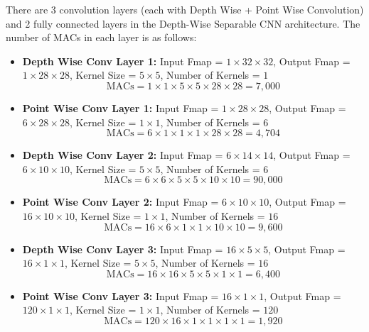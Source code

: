 \documentclass{article}
\begin{document}
There are 3 convolution layers (each with Depth Wise + Point Wise Convolution) and 2 fully connected layers in the Depth-Wise Separable CNN architecture. The number of MACs in each layer is as follows:

\begin{itemize}
    \item \textbf{Depth Wise Conv Layer 1:} Input Fmap = $1 \times 32 \times 32$, Output Fmap = $1 \times 28 \times 28$, Kernel Size = $5 \times 5$, Number of Kernels = $1$
    \begin{equation}
        \text{MACs} = 1 \times 1 \times 5 \times 5 \times 28 \times 28 = 7,000
    \end{equation}
    
    \item \textbf{Point Wise Conv Layer 1:} Input Fmap = $1 \times 28 \times 28$, Output Fmap = $6 \times 28 \times 28$, Kernel Size = $1 \times 1$, Number of Kernels = $6$
    \begin{equation}
        \text{MACs} = 6 \times 1 \times 1 \times 1 \times 28 \times 28 = 4,704
    \end{equation}
    
    \item \textbf{Depth Wise Conv Layer 2:} Input Fmap = $6 \times 14 \times 14$, Output Fmap = $6 \times 10 \times 10$, Kernel Size = $5 \times 5$, Number of Kernels = $6$
    \begin{equation}
        \text{MACs} = 6 \times 6 \times 5 \times 5 \times 10 \times 10 = 90,000
    \end{equation}
    
    \item \textbf{Point Wise Conv Layer 2:} Input Fmap = $6 \times 10 \times 10$, Output Fmap = $16 \times 10 \times 10$, Kernel Size = $1 \times 1$, Number of Kernels = $16$
    \begin{equation}
        \text{MACs} = 16 \times 6 \times 1 \times 1 \times 10 \times 10 = 9,600
    \end{equation}
    
    \item \textbf{Depth Wise Conv Layer 3:} Input Fmap = $16 \times 5 \times 5$, Output Fmap = $16 \times 1 \times 1$, Kernel Size = $5 \times 5$, Number of Kernels = $16$
    \begin{equation}
        \text{MACs} = 16 \times 16 \times 5 \times 5 \times 1 \times 1 = 6,400
    \end{equation}
    
    \item \textbf{Point Wise Conv Layer 3:} Input Fmap = $16 \times 1 \times 1$, Output Fmap = $120 \times 1 \times 1$, Kernel Size = $1 \times 1$, Number of Kernels = $120$
    \begin{equation}
        \text{MACs} = 120 \times 16 \times 1 \times 1 \times 1 \times 1 = 1,920
    \end{equation}
    

\end{itemize}
\end{document}
